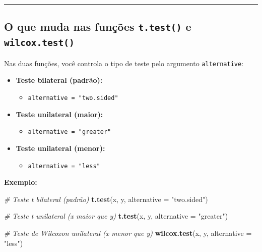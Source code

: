 \documentclass[
]{book}
\newenvironment{Shaded}{\begin{snugshade}}{\end{snugshade}}
\newcommand{\AttributeTok}[1]{\textcolor[rgb]{0.13,0.29,0.53}{#1}}
\newcommand{\CommentTok}[1]{\textcolor[rgb]{0.56,0.35,0.01}{\textit{#1}}}
\newcommand{\FunctionTok}[1]{\textcolor[rgb]{0.13,0.29,0.53}{\textbf{#1}}}
\newcommand{\NormalTok}[1]{#1}
\newcommand{\StringTok}[1]{\textcolor[rgb]{0.31,0.60,0.02}{#1}}
\providecommand{\tightlist}{%
  \setlength{\itemsep}{0pt}\setlength{\parskip}{0pt}}
\begin{document}
\begin{center}\rule{0.5\linewidth}{0.5pt}\end{center}

\subsection{\texorpdfstring{O que muda nas funções \texttt{t.test()} e \texttt{wilcox.test()}}{O que muda nas funções t.test() e wilcox.test()}}\label{o-que-muda-nas-funuxe7uxf5es-t.test-e-wilcox.test}

Nas duas funções, você controla o tipo de teste pelo argumento \texttt{alternative}:

\begin{itemize}
\tightlist
\item
  \textbf{Teste bilateral (padrão):}

  \begin{itemize}
  \tightlist
  \item
    \texttt{alternative\ =\ "two.sided"}
  \end{itemize}
\item
  \textbf{Teste unilateral (maior):}

  \begin{itemize}
  \tightlist
  \item
    \texttt{alternative\ =\ "greater"}
  \end{itemize}
\item
  \textbf{Teste unilateral (menor):}

  \begin{itemize}
  \tightlist
  \item
    \texttt{alternative\ =\ "less"}
  \end{itemize}
\end{itemize}

\textbf{Exemplo:}

\begin{Shaded}
\begin{Highlighting}[]
\CommentTok{\# Teste t bilateral (padrão)}
\FunctionTok{t.test}\NormalTok{(x, y, }\AttributeTok{alternative =} \StringTok{"two.sided"}\NormalTok{)}

\CommentTok{\# Teste t unilateral (x maior que y)}
\FunctionTok{t.test}\NormalTok{(x, y, }\AttributeTok{alternative =} \StringTok{"greater"}\NormalTok{)}

\CommentTok{\# Teste de Wilcoxon unilateral (x menor que y)}
\FunctionTok{wilcox.test}\NormalTok{(x, y, }\AttributeTok{alternative =} \StringTok{"less"}\NormalTok{)}
\end{Highlighting}
\end{Shaded}
\end{document}
